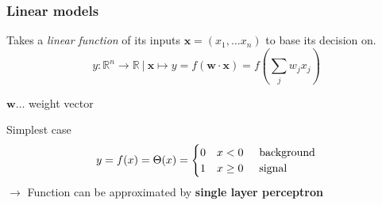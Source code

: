 \documentclass{beamer}
\begin{document}
\begin{frame}
    \frametitle{Linear models}
    Takes a \emph{linear function} of its inputs $\boldsymbol{x} = (x_{1},\dots x_{n})$ to base its decision on.\\
    $$ y: \mathbb{R}^{n} \to \mathbb{R}~|~\boldsymbol{x} \mapsto y = f (\boldsymbol{w} \cdot \boldsymbol{x}) = f (\sum_{j}w_{j}x_{j}) $$
    
    $\boldsymbol{w}\dots$ weight vector\\ 
    \vspace*{4mm}

    \pause
    Simplest case
    \[ 
         y = f(x)=\Theta(x)=
         \begin{cases} 
             0 & x < 0 \hspace*{5mm}\text{background}\\
             1  & x \geq 0 \hspace*{5mm}\text{signal}
        \end{cases} 
    \] 
    \pause
    \hspace*{5mm}$\to$ Function can be approximated by \textbf{single layer perceptron}
    
\end{frame} 
\end{document}
